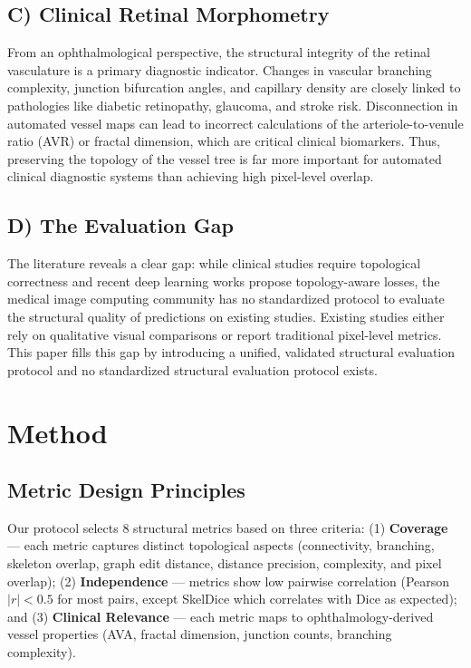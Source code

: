 \documentclass[conference]{IEEEtran}
\begin{document}
\subsection{C) Clinical Retinal Morphometry}
From an ophthalmological perspective, the structural integrity of the retinal vasculature is a primary diagnostic indicator. Changes in vascular branching complexity, junction bifurcation angles, and capillary density are closely linked to pathologies like diabetic retinopathy, glaucoma, and stroke risk. Disconnection in automated vessel maps can lead to incorrect calculations of the arteriole-to-venule ratio (AVR) or fractal dimension, which are critical clinical biomarkers. Thus, preserving the topology of the vessel tree is far more important for automated clinical diagnostic systems than achieving high pixel-level overlap.

\subsection{D) The Evaluation Gap}
The literature reveals a clear gap: while clinical studies require topological correctness and recent deep learning works propose topology-aware losses, the medical image computing community has no standardized protocol to evaluate the structural quality of predictions on existing studies. Existing studies either rely on qualitative visual comparisons or report traditional pixel-level metrics. This paper fills this gap by introducing a unified, validated structural evaluation protocol and no standardized structural evaluation protocol exists.

\section{Method}

\subsection{Metric Design Principles}
Our protocol selects 8 structural metrics based on three criteria: (1) \textbf{Coverage} — each metric captures distinct topological aspects (connectivity, branching, skeleton overlap, graph edit distance, distance precision, complexity, and pixel overlap); (2) \textbf{Independence} — metrics show low pairwise correlation (Pearson $|r| < 0.5$ for most pairs, except SkelDice which correlates with Dice as expected); and (3) \textbf{Clinical Relevance} — each metric maps to ophthalmology-derived vessel properties (AVA, fractal dimension, junction counts, branching complexity).
\end{document}
